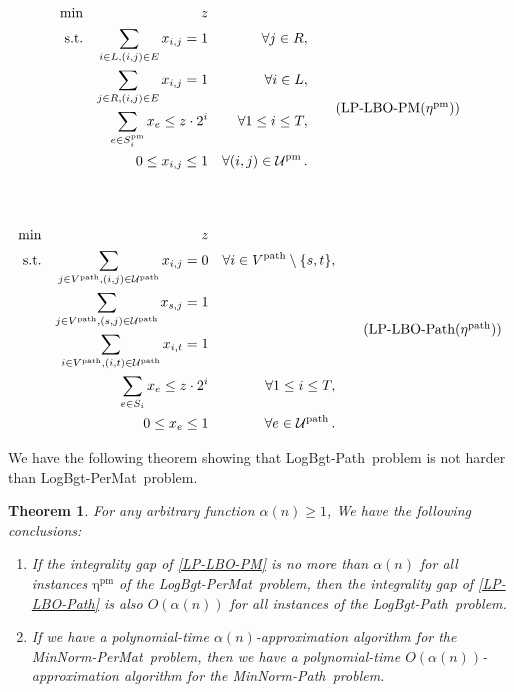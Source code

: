\documentclass[11pt,a4paper]{article} \usepackage{enumitem}
\newcommand{\calU}{\mathcal{U}}
\newcommand{\minnormmatch}{\textsf{MinNorm-PerMat}}
\newcommand{\LBOmatch}{\textsf{LogBgt-PerMat}}
\newcommand{\minnormpath}{\textsf{MinNorm-Path}}
\newcommand{\LBOpath}{\textsf{LogBgt-Path}}
\newcommand{\pathU}{\operatorname{\calU^{path}}}
\newcommand{\patheta}{\operatorname{\eta^{path}}}
\newcommand{\pathV}{V^{\operatorname{path}}}
\newcommand{\pmU}{\operatorname{\calU^{pm}}}
\newcommand{\pmS}[1]{\ifx\relax#1\relax
    S^{\operatorname{pm}} \else
    S^{\operatorname{pm}}_{#1} \fi
}
\newcommand{\pmeta}{\operatorname{\eta^{pm}}}
\newtheorem{theorem}{Theorem}[section]
\theoremstyle{definition}
\begin{document}
\begin{minipage}{0.4\textwidth}
\begin{equation}
    \begin{aligned}
    \min && z && \\
     \text{s.t.} && \sum_{i \in L, (i, j) \in E} x_{i, j} = 1 && \forall j \in R,\\
     && \sum_{j \in R, (i, j) \in E} x_{i, j} = 1 && \forall i \in L,\\
    && \sum_{e \in \pmS{i}} x_e \leq z \cdot 2^{i} && \forall 1 \leq i \leq T,\\
    && 0 \leq x_{i, j} \leq 1 && \forall (i, j) \in \pmU. \\
    && \vphantom{\sum_{j \in \pathV, (s, j) \in \pathU} x_{s, j} = 1}
    \end{aligned}
\tag{LP-LBO-PM($\pmeta$)}
\label{LP-LBO-PM}
\end{equation}
\end{minipage}
\hspace{0.05\textwidth}
\begin{minipage}{0.4\textwidth}
\begin{equation}
    \begin{aligned}
    \min && z && \\
    \text{s.t.} && \sum_{j \in \pathV, (i, j) \in \pathU} x_{i, j} = 0 && \forall i \in \pathV \setminus \{s, t\},\\
    && \sum_{j \in \pathV, (s, j) \in \pathU} x_{s, j} = 1 && \\
    && \sum_{i \in \pathV, (i, t) \in \pathU} x_{i, t} = 1 && \\
    && \sum_{e \in S_i} x_e \leq z \cdot 2^{i} && \forall 1 \leq i \leq T,\\
    && 0 \leq x_e \leq 1 && \forall e \in \pathU.
    \end{aligned}
\tag{LP-LBO-Path($\patheta$)}
\label{LP-LBO-Path}
\end{equation}
\end{minipage}



We have the following theorem showing that \LBOpath\ problem is not harder than \LBOmatch\ problem.

\begin{theorem}\label{thm:intgap-0}
For any arbitrary function $\alpha(n)\ge 1$, We have the following conclusions:
\begin{enumerate}[label=(\alph*), format=\normalfont]
\item If the integrality gap of \cref{LP-LBO-PM} is no more than $\alpha(n)$ for all instances 
$\pmeta$ of the \LBOmatch\ problem, 
then the integrality gap of \cref{LP-LBO-Path} is also $O(\alpha(n))$ for all instances of 
the \LBOpath\ problem.


\item If we have a polynomial-time $\alpha(n)$-approximation algorithm for the \minnormmatch\ problem, then we have a polynomial-time $O(\alpha(n))$-approximation algorithm for the \minnormpath\ problem.
\end{enumerate}
\end{theorem}
\end{document}
